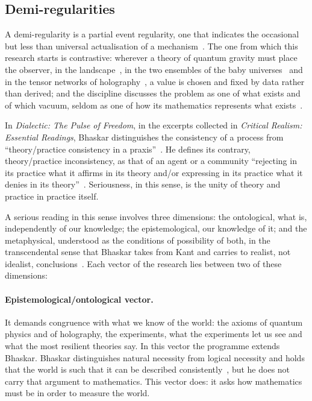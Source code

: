 \documentclass[11pt,reqno]{amsart}
\numberwithin{equation}{section}
\theoremstyle{remark}
\begin{document}
\subsection{Demi-regularities}
A demi-regularity is a partial event regularity, one that indicates the occasional but less than
universal actualisation of a mechanism~\cite[p.~149]{Law97}. The one from which this research starts
is contrastive: wherever a theory of quantum gravity must place the observer, in the
landscape~\cite{BP00}, in the two ensembles of the baby universes~\cite{MM20,SSS19} and in the tensor
networks of holography~\cite{Swi12,PYHP15,JE21}, a value is chosen and fixed by data rather than
derived; and the discipline discusses the problem as one of what exists and of which vacuum, seldom as
one of how its mathematics represents what exists~\cite{REPR}.

In \emph{Dialectic: The Pulse of Freedom}, in the excerpts collected in
\emph{Critical Realism: Essential Readings}, Bhaskar distinguishes the consistency of a process from
``theory/practice consistency in a praxis''~\cite[p.~654]{Bha93b}. He defines its
contrary, theory/practice inconsistency, as that of an agent or a community ``rejecting in its
practice what it affirms in its theory and/or expressing in its practice what it denies in its
theory''~\cite[p.~614]{Bha93a}. Seriousness, in this sense, is the unity of theory and practice in practice
itself.

A serious reading in this sense involves three dimensions: the ontological, what is, independently
of our knowledge; the epistemological, our knowledge of it; and the metaphysical, understood as the
conditions of possibility of both, in the transcendental sense that Bhaskar takes from Kant and
carries to realist, not idealist, conclusions~\cite{Bha75}. Each vector of the research lies between
two of these dimensions:

\paragraph{Epistemological/ontological vector.} It demands congruence with what we know of the world: the
axioms of quantum physics and of holography, the experiments, what the experiments let us see and
what the most resilient theories say. In this vector the programme extends Bhaskar. Bhaskar
distinguishes natural necessity from logical necessity and holds that the world is such that it can be described consistently~\cite[p.~191]{Bha75}, but he does not carry that argument to mathematics. This
vector does: it asks how mathematics must be in order to measure the world.
\end{document}
